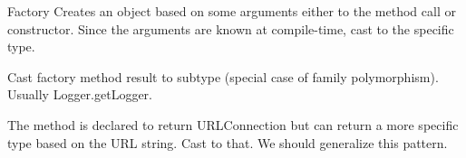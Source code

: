 \begin{pattern}{Factory}
Creates an object based on some arguments either to the method call or constructor.
Since the arguments are known at compile-time, cast to the specific type.

Cast factory method result to subtype (special case of family polymorphism).
Usually Logger.getLogger.

The method is declared to return URLConnection but can return a more specific type based on the URL string.
Cast to that.
We should generalize this pattern.

\instances{}

\detection{}

\discussion{}

\related{}

\end{pattern}